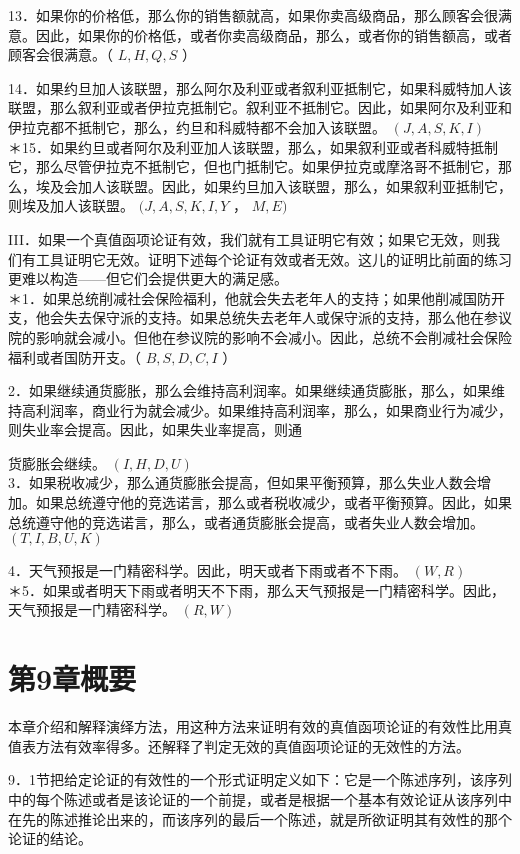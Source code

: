 13．如果你的价格低，那么你的销售额就高，如果你卖高级商品，那么顾客会很满意。因此，如果你的价格低，或者你卖高级商品，那么，或者你的销售额高，或者顾客会很满意。（ $L, H, Q, S$ ）

14．如果约旦加人该联盟，那么阿尔及利亚或者叙利亚抵制它，如果科威特加人该联盟，那么叙利亚或者伊拉克抵制它。叙利亚不抵制它。因此，如果阿尔及利亚和伊拉克都不抵制它，那么，约旦和科威特都不会加入该联盟。 $(J, A, S, K, I)$\\
＊15．如果约旦或者阿尔及利亚加人该联盟，那么，如果叙利亚或者科威特抵制它，那么尽管伊拉克不抵制它，但也门抵制它。如果伊拉克或摩洛哥不抵制它，那么，埃及会加人该联盟。因此，如果约旦加入该联盟，那么，如果叙利亚抵制它，则埃及加人该联盟。 $(J, A, S, K, I, Y$ ， $M, E)$

III．如果一个真值函项论证有效，我们就有工具证明它有效；如果它无效，则我们有工具证明它无效。证明下述每个论证有效或者无效。这儿的证明比前面的练习更难以构造——但它们会提供更大的满足感。\\
＊1．如果总统削减社会保险福利，他就会失去老年人的支持；如果他削减国防开支，他会失去保守派的支持。如果总统失去老年人或保守派的支持，那么他在参议院的影响就会减小。但他在参议院的影响不会减小。因此，总统不会削减社会保险福利或者国防开支。（ $B, S, D, C, I$ ）

2．如果继续通货膨胀，那么会维持高利润率。如果继续通货膨胀，那么，如果维持高利润率，商业行为就会减少。如果维持高利润率，那么，如果商业行为减少，则失业率会提高。因此，如果失业率提高，则通

货膨胀会继续。 $(I, H, D, U)$\\
3．如果税收减少，那么通货膨胀会提高，但如果平衡预算，那么失业人数会增加。如果总统遵守他的竞选诺言，那么或者税收减少，或者平衡预算。因此，如果总统遵守他的竞选诺言，那么，或者通货膨胀会提高，或者失业人数会增加。 $(T, I, B, U, K)$

4．天气预报是一门精密科学。因此，明天或者下雨或者不下雨。 $(W, R)$\\
＊5．如果或者明天下雨或者明天不下雨，那么天气预报是一门精密科学。因此，天气预报是一门精密科学。 $(R, W)$

\section*{第9章概要}
本章介绍和解释演绎方法，用这种方法来证明有效的真值函项论证的有效性比用真值表方法有效率得多。还解释了判定无效的真值函项论证的无效性的方法。

9．1节把给定论证的有效性的一个形式证明定义如下：它是一个陈述序列，该序列中的每个陈述或者是该论证的一个前提，或者是根据一个基本有效论证从该序列中在先的陈述推论出来的，而该序列的最后一个陈述，就是所欲证明其有效性的那个论证的结论。

